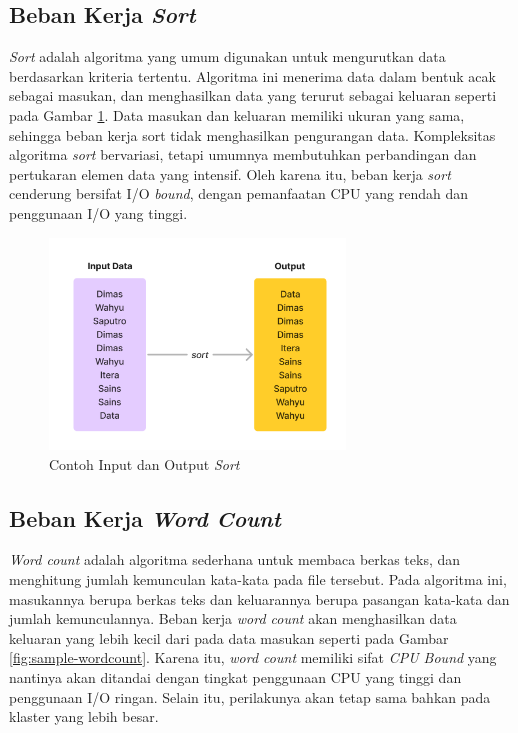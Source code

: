 \subsection{Beban Kerja \textit{Sort}}
\textit{Sort} adalah algoritma yang umum digunakan untuk mengurutkan data berdasarkan kriteria tertentu. Algoritma ini menerima data dalam bentuk acak sebagai masukan, dan menghasilkan data yang terurut sebagai keluaran seperti pada Gambar \ref{fig:sample-sort}. Data masukan dan keluaran memiliki ukuran yang sama, sehingga beban kerja sort tidak menghasilkan pengurangan data.
Kompleksitas algoritma \textit{sort} bervariasi, tetapi umumnya membutuhkan perbandingan dan pertukaran elemen data yang intensif. Oleh karena itu, beban kerja \textit{sort} cenderung bersifat I/O \textit{bound}, dengan pemanfaatan CPU yang rendah dan penggunaan I/O yang tinggi. 

\begin{figure}[h]
    \centering
    \includegraphics[width=0.7\textwidth]{figures/ch02/sample-sort}
    \caption{Contoh Input dan Output \textit{Sort}}
    \label{fig:sample-sort}
\end{figure}

\subsection{Beban Kerja \textit{Word Count}}
\textit{Word count} adalah algoritma sederhana untuk membaca berkas teks, dan menghitung jumlah kemunculan kata-kata pada file tersebut. Pada algoritma ini, masukannya berupa berkas teks dan keluarannya berupa pasangan kata-kata dan jumlah kemunculannya. Beban kerja \textit{word count} akan menghasilkan data keluaran yang lebih kecil dari pada data masukan seperti pada Gambar \ref{fig:sample-wordcount}.
Karena itu, \textit{word count} memiliki sifat \textit{CPU Bound} yang nantinya akan ditandai dengan tingkat penggunaan CPU yang tinggi dan penggunaan I/O ringan. Selain itu, perilakunya akan tetap sama bahkan pada klaster yang lebih besar.

